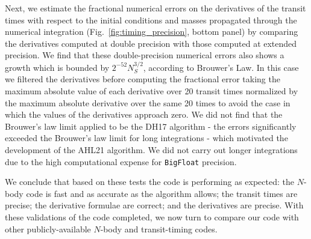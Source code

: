 \documentclass[fleqn,usenatbib,twocolumn]{mnras}
\begin{document}
Next, we estimate the fractional numerical errors on the derivatives of the transit times with respect to the initial conditions and masses propagated through the numerical integration (Fig.\ \ref{fig:timing_precision}, bottom panel) by comparing the derivatives computed at double precision with those computed at extended precision.  We find that these double-precision numerical errors also shows a growth which is bounded by
$2^{-52}N_S^{3/2}$, according to Brouwer's Law.  In this case we filtered the derivatives before computing the fractional error taking the maximum absolute value of each derivative over 20 transit times normalized by the maximum absolute derivative over the same 20 times to avoid the case in which the values of the derivatives approach zero.  We did not find that the Brouwer's law limit applied to be the DH17 algorithm - the errors significantly exceeded the Brouwer's law limit for long integrations - which motivated the development of the {\sc AHL21} algorithm.
We did not carry out longer integrations due to the high computational expense for \texttt{BigFloat} precision.

We conclude that based on these tests the code is performing as expected:  the $N$-body code is fast and as accurate as the algorithm allows; the transit times are precise; the derivative formulae are correct; and the derivatives are precise.  With these validations of the code completed, we now turn to compare our code with other publicly-available $N$-body and transit-timing codes.
\end{document}
